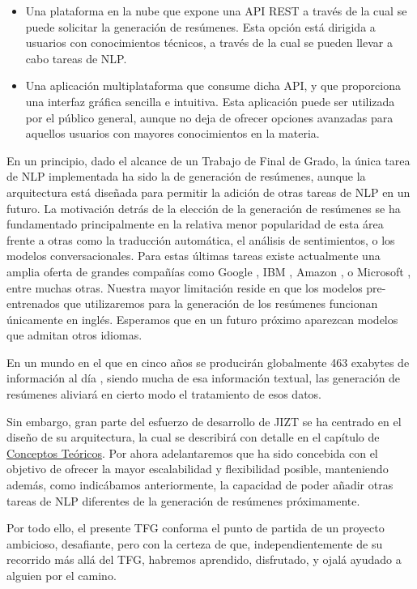 \vspace*{-0.3cm}

\begin{itemize}
	\item[\textbullet] Una plataforma en la nube que expone una API REST a través de la cual se puede solicitar la generación de resúmenes. Esta opción está dirigida a usuarios con conocimientos técnicos, a través de la cual se pueden llevar a cabo tareas de NLP.
	\item[\textbullet] Una aplicación multiplataforma que consume dicha API, y que proporciona una interfaz gráfica sencilla e intuitiva. Esta aplicación puede ser utilizada por el público general, aunque no deja de ofrecer opciones avanzadas para aquellos usuarios con mayores conocimientos en la materia.
\end{itemize}

\vspace{-0.3cm}

En un principio, dado el alcance de un Trabajo de Final de Grado, la única tarea de NLP implementada ha sido la de generación de resúmenes, aunque la arquitectura está diseñada para permitir la adición de otras tareas de NLP en un futuro. La motivación detrás de la elección de la generación de resúmenes se ha fundamentado principalmente en la relativa menor popularidad de esta área frente a otras como la traducción automática, el análisis de sentimientos, o los modelos conversacionales. Para estas últimas tareas existe actualmente una amplia oferta de grandes compañías como Google \cite{cloudNL}, IBM \cite{watson}, Amazon \cite{comprehend}, o Microsoft \cite{textAnalytics}, entre muchas otras. Nuestra mayor limitación reside en que los modelos pre-entrenados que utilizaremos para la generación de los resúmenes funcionan únicamente en inglés. Esperamos que en un futuro próximo aparezcan modelos que admitan otros idiomas.

En un mundo en el que en cinco años se producirán globalmente 463 exabytes de información al día \cite{raconteur19}, siendo mucha de esa información textual, las generación de resúmenes aliviará en cierto modo el tratamiento de esos datos.

Sin embargo, gran parte del esfuerzo de desarrollo de JIZT se ha centrado en el diseño de su arquitectura, la cual se describirá con detalle en el capítulo de \hyperref[chapter:conceptos]{Conceptos Teóricos}. Por ahora adelantaremos que ha sido concebida con el objetivo de ofrecer la mayor escalabilidad y flexibilidad posible, manteniendo además, como indicábamos anteriormente, la capacidad de poder añadir otras tareas de NLP diferentes de la generación de resúmenes próximamente.

Por todo ello, el presente TFG conforma el punto de partida de un proyecto ambicioso, desafiante, pero con la certeza de que, independientemente de su recorrido más allá del TFG, habremos aprendido, disfrutado, y ojalá ayudado a alguien por el camino.
